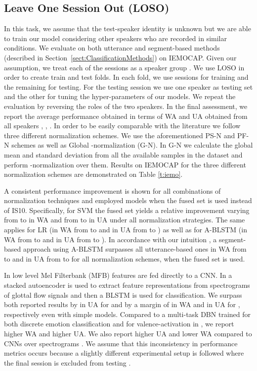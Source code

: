\documentclass[a4paper]{article}
\begin{document}
\subsection{Leave One Session Out (LOSO)}
In this task, we assume that the test-speaker identity is unknown but we are able to train our model considering other speakers who are recorded in similar conditions. We evaluate on both utterance and segment-based methods (described in Section~\ref{sect:ClassificationMethods}) on IEMOCAP. Given our assumption, we treat each of the  sessions as a speaker group \cite{IEMOCAP}. We use LOSO in order to create train and test folds. In each fold, we use  sessions for training and the remaining  for testing. For the testing session we use one speaker as testing set and the other for tuning the hyper-parameters of our models. We repeat the evaluation by reversing the roles of the two speakers. 
In the final assessment, we report the average performance obtained in terms of WA and UA obtained from all speakers \cite{emily2017regionalsaliency}, \cite{xia2017multi}, \cite{ghosh2016representation}. In order to be easily comparable with the literature we follow three different normalization schemes. We use the aforementioned PS-N and PF-N schemes as well as Global -normalization (G-N). In G-N we calculate the global mean and standard deviation from all the available samples in the dataset and perform -normalization over them. Results on IEMOCAP for the three different normalization schemes are demonstrated on Table \ref{t:iemo}.

A consistent performance improvement is shown for all combinations of normalization techniques and employed models when the fused set is used instead of IS10. Specifically, for SVM the fused set yields a relative improvement varying from  to  in WA and from  to  in UA under all normalization strategies. The same applies for LR (in WA from  to  and in UA from  to  ) as well as for A-BLSTM (in WA from  to  and in UA from  to ). In accordance with our intuition \cite{tzinis2017segment}, a segment-based approach using A-BLSTM surpasses all utterance-based ones in WA from  to  and in UA from  to  for all normalization schemes, when the fused set is used. 

In \cite{emily2017regionalsaliency} low level Mel Filterbank (MFB) features are fed directly to a CNN. In \cite{ghosh2016representation} a stacked autoencoder is used to extract feature representations from spectrograms of glottal flow signals and then a BLSTM is used for classification. We surpass both reported results by  in UA for \cite{emily2017regionalsaliency} and by a margin of  in WA and  in UA for \cite{ghosh2016representation}, respectively even with simple models. 
Compared to a multi-task DBN trained for both discrete emotion classification and for valence-activation in \cite{xia2017multi}, we report  higher WA and  higher UA. 
We also report  higher UA and  lower WA compared to CNNs over spectrograms \cite{fayek2017stateoftheart}. We assume that this inconsistency in performance metrics occurs because a slightly different experimental setup is followed where the final session is excluded from testing \cite{fayek2017stateoftheart}.   
\end{document}
